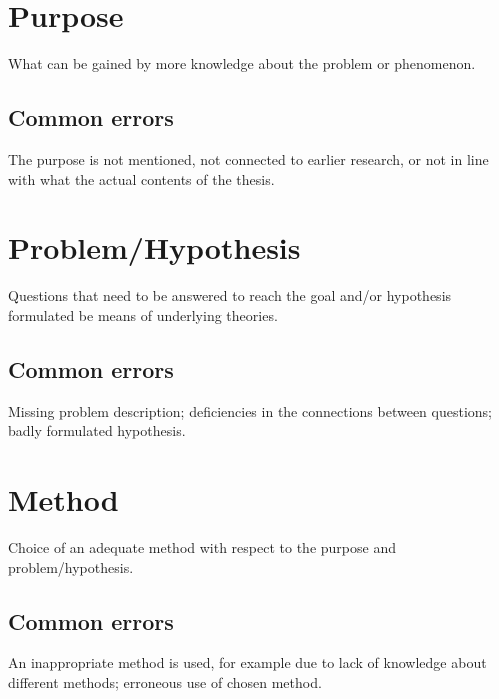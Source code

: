     \section{Purpose}
    What can be gained by more knowledge about the problem or phenomenon. 
    \subsection{Common errors}
    The purpose is not mentioned, not connected to earlier research, or not in line with what the actual contents of the thesis.  
    
    \section{Problem/Hypothesis} 
    Questions that need to be answered to reach 
    the goal and/or hypothesis formulated be means of 
    underlying theories. 
    \subsection{Common errors}
    Missing problem description; deficiencies in the connections between questions; badly formulated 
    hypothesis.  
    
    \section{Method} 
    Choice of an adequate method with respect to the 
    purpose and problem/hypothesis. 
    
    \subsection{Common errors}
    An inappropriate method is used, for example due to lack of knowledge about different methods; 
    erroneous use of chosen method.  
\fi